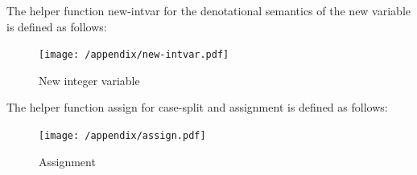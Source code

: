 \documentclass[12pt,a4paper]{report}
\theoremstyle{definition}
\begin{document}
    The helper function \textsf{new-intvar} for the denotational semantics of the new variable is defined as follows:
    \begin{figure}[H]
        \centering
        \texttt{[image: /appendix/new-intvar.pdf]}
        \caption{New integer variable}
        \label{fig: new_intvar}
    \end{figure}
    The helper function \textsf{assign} for case-split and assignment is defined as follows:
    \begin{figure}[H]
        \centering
        \texttt{[image: /appendix/assign.pdf]}
        \caption{Assignment}
        \label{fig: assign}
    \end{figure}




\cleardoublepage
\let\cleardoublepage\clearpage
\pagestyle{empty}

\AtBeginShipoutNext{\AtBeginShipoutDiscard}
\end{document}
